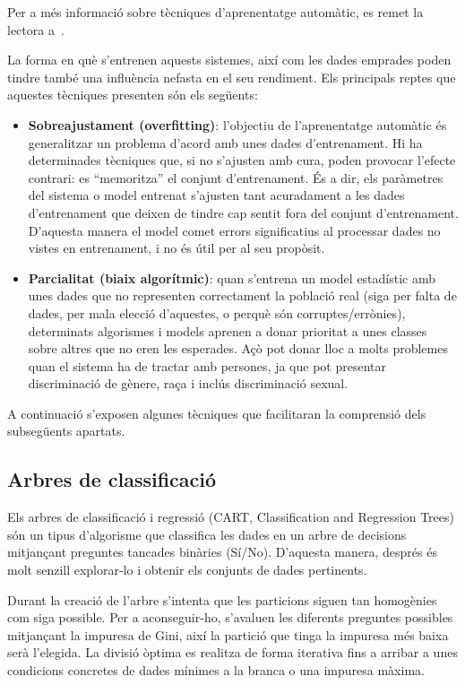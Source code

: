 Per a més informació sobre tècniques d'aprenentatge automàtic, es remet la lectora a~\cite{russell2020artificial}.

La forma en què s'entrenen aquests sistemes, així com les dades emprades poden tindre també una influència nefasta en el seu rendiment. Els principals reptes que aquestes tècniques presenten són els següents:
\begin{itemize}
    \item \textbf{Sobreajustament (overfitting)}: l'objectiu de l'aprenentatge automàtic és generalitzar un problema d'acord amb unes dades d'entrenament. 
    Hi ha determinades tècniques que, si no s'ajusten amb cura, poden provocar l'efecte contrari: es ``memoritza'' el conjunt d'entrenament. És a dir, els paràmetres del sistema o model entrenat s'ajusten tant acuradament a les dades d'entrenament que deixen de tindre cap sentit fora del conjunt d'entrenament. 
    D'aquesta manera el model comet errors significatius al processar dades no vistes en entrenament, i no és útil per al seu propòsit.

    \item \textbf{Parcialitat (biaix algorítmic)}: quan s'entrena un model estadístic amb unes dades que no representen correctament la població real (siga per falta de dades, per mala elecció d'aquestes, o perquè són corruptes/errònies), determinats algorismes i models aprenen a donar prioritat a unes classes sobre altres que no eren les esperades.
    Açò pot donar lloc a molts problemes quan el sistema ha de tractar amb persones, ja que pot presentar discriminació de gènere\cite{bias_gender_discrim}, raça\cite{bias_racial_discrim} i inclús discriminació sexual\cite{bias_sexual_discrim}.
\end{itemize}

A continuació s'exposen algunes tècniques que facilitaran la comprensió dels subsegüents apartats.

\subsection{Arbres de classificació}
Els arbres de classificació i regressió (CART, Classification and Regression Trees) són un tipus d'algorisme que classifica les dades en un arbre de decisions mitjançant preguntes tancades binàries (Sí/No). D'aquesta manera, després és molt senzill explorar-lo i obtenir els conjunts de dades pertinents.

Durant la creació de l'arbre s'intenta que les particions siguen tan homogènies com siga possible. Per a aconseguir-ho, s'avaluen les diferents preguntes possibles mitjançant la impuresa de Gini, així la partició que tinga la impuresa més baixa serà l'elegida.
La divisió òptima es realitza de forma iterativa fins a arribar a unes condicions concretes de dades mínimes a la branca o una impuresa màxima.

